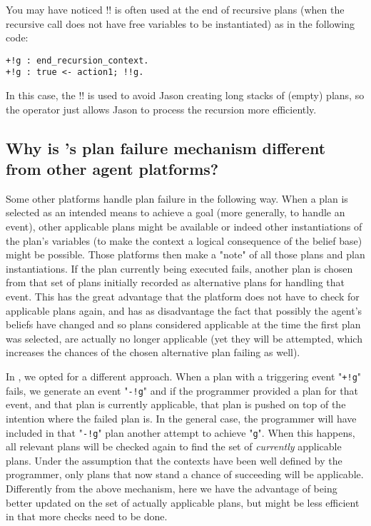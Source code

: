 \documentclass{article}
\newcommand{\jason}[0]{\htlink{\textit{Jason}}{http://jason.sf.net}\xspace}
\begin{document}
\begin{description}
You may have noticed !! is often used at the end of recursive plans
(when the recursive call does not have free variables to be
instantiated) as in the following code:
\begin{verbatim}
+!g : end_recursion_context.
+!g : true <- action1; !!g.
\end{verbatim}
In this case, the !! is used to avoid Jason creating long stacks of
(empty) plans, so the operator just allows Jason to process the
recursion more efficiently.


\subsection{Why is \jason's plan failure mechanism different from
  other agent platforms?}

Some other platforms handle plan failure in the following way. When a
plan is selected as an intended means to achieve a goal (more
generally, to handle an event), other applicable plans might be
available or indeed other instantiations of the plan's variables (to
make the context a logical consequence of the belief base) might be
possible. Those platforms then make a "note" of all those plans and
plan instantiations. If the plan currently being executed fails,
another plan is chosen from that set of plans initially recorded as
alternative plans for handling that event. This has the great
advantage that the platform does not have to check for applicable
plans again, and has as disadvantage the fact that possibly the
agent's beliefs have changed and so plans considered applicable at the
time the first plan was selected, are actually no longer applicable
(yet they will be attempted, which increases the chances of the chosen
alternative plan failing as well).

In \jason, we opted for a different approach. When a plan with a
triggering event "\texttt{+!g}" fails, we generate an event
"\texttt{-!g}" and if the programmer provided a plan for that event,
and that plan is currently applicable, that plan is pushed on top of the
intention where the failed plan is. In the general case, the
programmer will have included in that "\texttt{-!g}" plan another
attempt to achieve "\texttt{g}". When this happens, all relevant plans
will be checked again to find the set of \emph{currently} applicable
plans. Under the assumption that the contexts have been well defined
by the programmer, only plans that now stand a chance of succeeding
will be applicable. Differently from the above mechanism, here we have
the advantage of being better updated on the set of actually
applicable plans, but might be less efficient in that more checks need
to be done.


\end{description}
\end{document}
